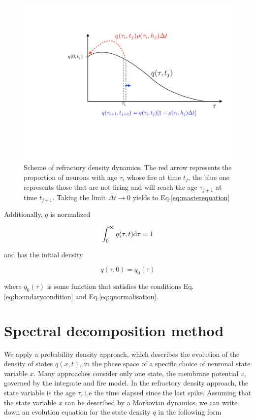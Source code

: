 \documentclass[12pt,twoside]{report}
\def \dd  {{\rm d}}
\begin{document}
\begin{figure}[h!]
	\centering
	\includegraphics[width=0.7\linewidth]{qtau.pdf}
	\caption{Scheme of refractory density dynamics. The red arrow represents the proportion of neurons with age $\tau_i$ whose fire at time $t_j$, the blue one represents those that are not firing and will reach the age $\tau_{j+1}$ at time $t_{j+1}$. Taking the limit $\Delta t \rightarrow 0$ yields to Eq.\eqref{eq:masterequation}
	}
	\label{fig:qtau}
\end{figure}

Additionally, $q$ is normalized

\begin{equation}
\label{eq:qnormalisation}
\int_0^\infty q(\tau,t)\dd \tau = 1
\end{equation}

and has the initial density

\begin{equation}
\label{eq:qinitial}
q(\tau,0)=q_0(\tau)
\end{equation}

where $q_0(\tau)$ is some function that satisfies the conditions Eq.\eqref{eq:boundarycondition} and Eq.\eqref{eq:qnormalisation}.


\section{Spectral decomposition method}
\label{sec:spect}


We apply a probability density approach, which describes the evolution of the density of states $q(x,t)$, in the phase space of a specific choice of neuronal state variable $x$.
Many approaches consider only one state, the membrane potential $v$, governed by the integrate and fire model. In the refractory density approach, the state variable is the age $\tau$, i.e the time elapsed since the last spike. Assuming that the state variable $x$ can be described by a Markovian dynamics, we can write down an evolution equation for the state density $q$ in the following form
\end{document}

